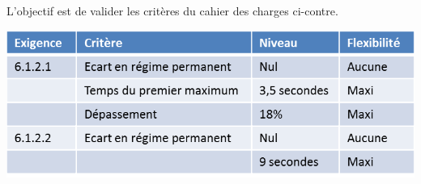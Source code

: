 \documentclass[11pt,oneside]{article}
\begin{document}
\begin{obj}
\begin{minipage}[c]{.47\linewidth}
L'objectif est de valider les critères du cahier des charges ci-contre.
\end{minipage}\hfill
\begin{minipage}[c]{.47\linewidth}
\begin{center}
\includegraphics[width=.95\linewidth]{png/cdc}
\end{center}
\end{minipage}
\end{obj}
\end{document}
